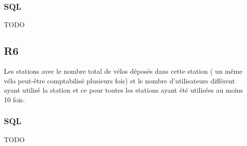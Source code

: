 \documentclass[a4paper, 12pt]{report}
\begin{document}
\subsubsection*{SQL}
TODO%

\subsection*{R6}

Les stations avec le nombre total de vélos déposés dans cette station ( un même vélo peut-être comptabilisé plusieurs fois) et le nombre d'utilisateurs différent ayant utilisé la station et ce pour toutes les stations ayant été utilisées au moins 10 fois.

\subsubsection*{SQL}
TODO%
\end{document}
